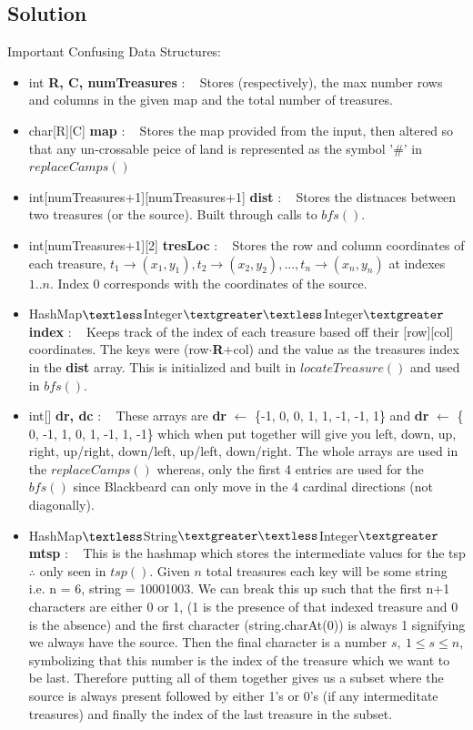 \documentclass[12pt]{article}
\begin{document}
\subsection{Solution}
Important Confusing Data Structures:
\begin{itemize}
    \item int \textbf{R, C, numTreasures} : ~ Stores (respectively), the max number rows and columns
     in the given map and the total number of treasures.
    \item char[R][C] \textbf{map} : ~ Stores the map provided from the input, then altered so that any
        un-crossable peice of land is represented as the symbol '\#' in $replaceCamps()$
    \item int[numTreasures+1][numTreasures+1] \textbf{dist} : ~ Stores the distnaces between two treasures
        (or the source). Built through calls to $bfs()$.
    \item int[numTreasures+1][2] \textbf{tresLoc} : ~ Stores the row and column coordinates of each
        treasure, $t_1\rightarrow(x_1,y_1), t_2\rightarrow(x_2,y_2), ..., t_n\rightarrow(x_n,y_n)$ at
        indexes $1..n$. Index 0 corresponds with the coordinates of the source.
    \item HashMap$\textless$Integer$\textgreater\textless$Integer$\textgreater$ \textbf{index} : ~
        Keeps track of the index of each treasure based off their [row][col] coordinates. The keys
        were (row$\cdot$\textbf{R}+col) and the value as the treasures index in the \textbf{dist} array.
        This is initialized and built in $locateTreasure()$ and used in $bfs()$.
    \item int[] \textbf{dr, dc} : ~ These arrays are \textbf{dr} $\gets$ \{-1,  0, 0, 1, 1, -1, -1,  1\}
        and \textbf{dr} $\gets$ \{ 0, -1, 1, 0, 1, -1,  1, -1\} which when put together will give you
        left, down, up, right, up/right, down/left, up/left, down/right. The whole arrays are used in the
        $replaceCamps()$ whereas, only the first 4 entries are used for the $bfs()$ since Blackbeard can
        only move in the 4 cardinal directions (not diagonally).
    \item HashMap$\textless$String$\textgreater\textless$Integer$\textgreater$ \textbf{mtsp} : ~ This is
        the hashmap which stores the intermediate values for the tsp $\therefore$ only seen in $tsp()$.
        Given $n$ total treasures each key will be some string i.e. n = 6, string = 10001003. We can break
        this up such that the first n+1 characters are either 0 or 1, (1 is the presence of that indexed
        treasure and 0 is the absence) and the first character (string.charAt(0)) is always 1 signifying
        we always have the source. Then the final character is a number $s,\ 1\leq s\leq n$, symbolizing
        that this number is the index of the treasure which we want to be last. Therefore putting all of
        them together gives us a subset where the source is always present followed by either 1's or 0's
        (if any intermeditate treasures) and finally the index of the last treasure in the subset.
\end{itemize}
\end{document}
